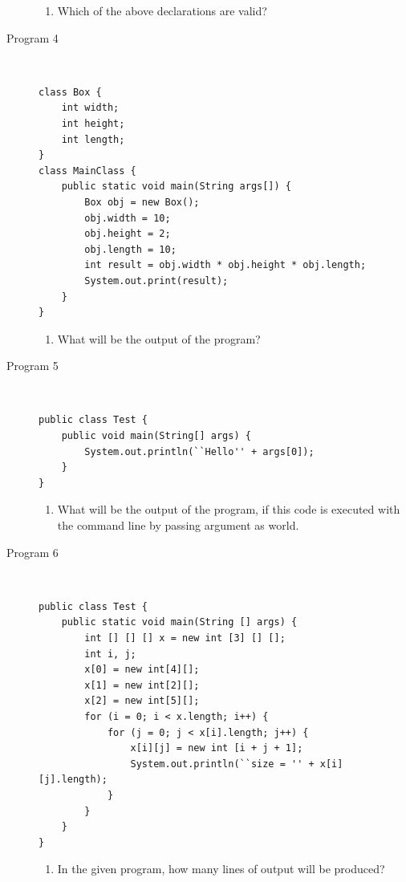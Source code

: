 \documentclass[11pt,a4paper]{article}
\def\AnswerBox{\fbox{\begin{minipage}{4in}\hfill\vspace{0.5in}\end{minipage}}}
\begin{document}
\begin{description}
\begin{enumerate}[label=\bfseries Q\arabic*:]\itemsep10pt
 \item Which of the above declarations are valid?
\end{enumerate}
\item [Program 4] \
\begin{lstlisting}
class Box {
    int width;
    int height;
    int length;
} 
class MainClass {
    public static void main(String args[]) {        
        Box obj = new Box();
        obj.width = 10;
        obj.height = 2;
        obj.length = 10;
        int result = obj.width * obj.height * obj.length; 
        System.out.print(result);
    } 
}
\end{lstlisting}

\AnswerBox

\begin{enumerate}[label=\bfseries Q\arabic*:]\itemsep10pt
\item What will be the output of the program?
\end{enumerate}

\item [Program 5] \
\begin{lstlisting}
public class Test {    
    public void main(String[] args) {  
        System.out.println(``Hello'' + args[0]); 
    } 
}
\end{lstlisting}

\AnswerBox

\begin{enumerate}[label=\bfseries Q\arabic*:]\itemsep10pt
\item What will be the output of the program, if this code is executed with the command line by passing argument as world.
\end{enumerate}

\item [Program 6] \
\begin{lstlisting}
public class Test {
    public static void main(String [] args) {
        int [] [] [] x = new int [3] [] [];
        int i, j;
        x[0] = new int[4][];
        x[1] = new int[2][];
        x[2] = new int[5][];
        for (i = 0; i < x.length; i++) {
            for (j = 0; j < x[i].length; j++) {
                x[i][j] = new int [i + j + 1];
                System.out.println(``size = '' + x[i][j].length);
            }
        }
    }
}
\end{lstlisting}

\AnswerBox

\begin{enumerate}[label=\bfseries Q\arabic*:]\itemsep10pt
\item In the given program, how many lines of output will be produced?
\end{enumerate}


\end{description}
\end{document}
